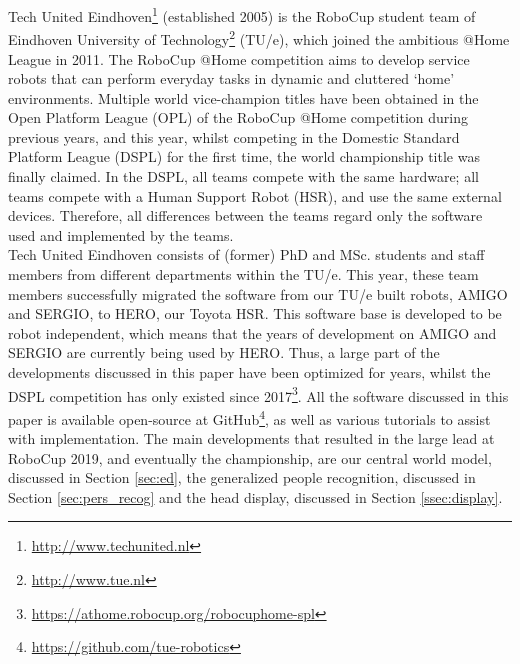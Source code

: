 Tech United Eindhoven\footnote{\url{http://www.techunited.nl}} (established 2005) is the RoboCup student team of Eindhoven University of Technology\footnote{\url{http://www.tue.nl}} (TU/e), which joined the ambitious @Home League in 2011. The RoboCup @Home competition aims to develop service robots that can perform everyday tasks in dynamic and cluttered `home' environments.
Multiple world vice-champion titles have been obtained in the Open Platform League (OPL) of the RoboCup @Home competition during previous years, and this year, whilst competing in the Domestic Standard Platform League (DSPL) for the first time, the world championship title was finally claimed. In the DSPL, all teams compete with the same hardware; all teams compete with a Human Support Robot (HSR), and use the same external devices. Therefore, all differences between the teams regard only the software used and implemented by the teams. \\

\noindent Tech United Eindhoven consists of (former) PhD and MSc. students and staff members from different departments within the TU/e. This year, these team members successfully migrated the software from our TU/e built robots, AMIGO and SERGIO, to HERO, our Toyota HSR. This software base is developed to be robot independent, which means that the years of development on AMIGO and SERGIO are currently being used by HERO. Thus, a large part of the developments discussed in this paper have been optimized for years, whilst the DSPL competition has only existed since 2017\footnote{\url{https://athome.robocup.org/robocuphome-spl}}. All the software discussed in this paper is available open-source at GitHub\footnote{\url{https://github.com/tue-robotics}}, as well as various tutorials to assist with implementation. The main developments that resulted in the large lead at RoboCup 2019, and eventually the championship, are our central world model, discussed in Section \ref{sec:ed}, the generalized people recognition, discussed in Section \ref{sec:pers_recog} and the head display, discussed in Section \ref{ssec:display}.


